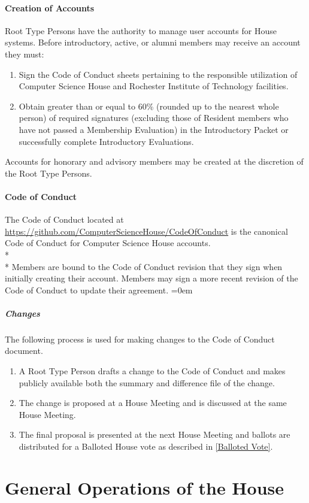 \documentclass{article}
\newcommand{\article}[1]{\section{#1} \label{#1}}
\newcommand{\asubsubsection}[1]{\paragraph{#1} \label{#1}}
\newcommand{\asubsubsubsection}[1]{\parindent=0em\subparagraph{#1} \label{#1}}
\begin{document}
\asubsubsection{Creation of Accounts}
Root Type Persons have the authority to manage user accounts for House systems.
Before introductory, active, or alumni members may receive an account they must:
\renewcommand{\theenumi}{\alph{enumi}} %
\begin{enumerate}
	\item Sign the Code of Conduct sheets pertaining to the responsible utilization of Computer Science House and Rochester Institute of Technology facilities.
	\item Obtain greater than or equal to 60\% (rounded up to the nearest whole person) of required signatures (excluding those of Resident members who have not passed a Membership Evaluation) in the Introductory Packet or successfully complete Introductory Evaluations.
\end{enumerate}
Accounts for honorary and advisory members may be created at the discretion of the Root Type Persons.

\asubsubsection{Code of Conduct}
The Code of Conduct located at \url{https://github.com/ComputerScienceHouse/CodeOfConduct} is the canonical Code of Conduct for Computer Science House accounts.
\\* \\*
Members are bound to the Code of Conduct revision that they sign when initially creating their account.
Members may sign a more recent revision of the Code of Conduct to update their agreement.
\asubsubsubsection{Changes}
The following process is used for making changes to the Code of Conduct document.
\begin{enumerate}
	\item A Root Type Person drafts a change to the Code of Conduct and makes publicly available both the summary and difference file of the change.
	\item The change is proposed at a House Meeting and is discussed at the same House Meeting.
	\item The final proposal is presented at the next House Meeting and ballots are distributed for a Balloted House vote as described in \ref{Balloted Vote}.
\end{enumerate}

\article{General Operations of the House}
\end{document}
